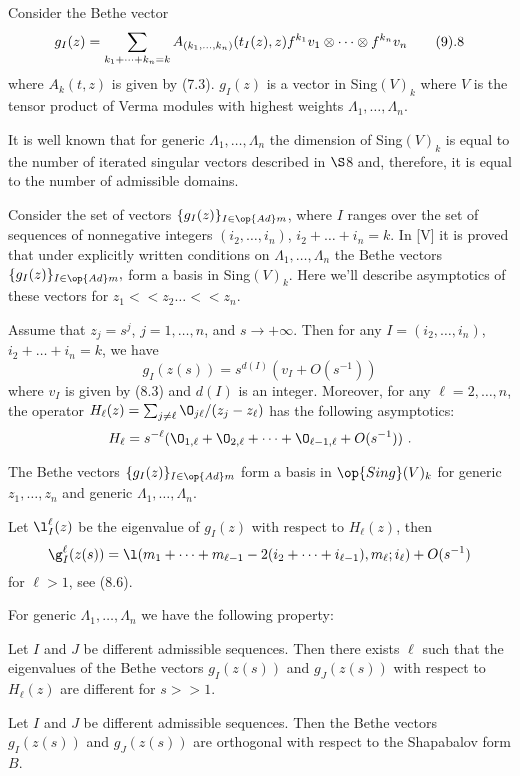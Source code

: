 Consider the Bethe vector
$$
g_I(z) = \sum_{k_1+\dots +k_n=k} A_{(k_1,\dots ,k_n)}
(t_I(z),z)f^{k_1}v_1\otimes\dots\otimes f^{k_n}v_n    \tag 9.8
$$
where $A_k(t,z)$ is given by (7.3). $g_I(z)$ is a vector in
Sing$(V)_k$ where $V$ is the tensor product of Verma modules with
highest weights $\Lambda _1,\dots ,\Lambda _n$.

It is well known that for generic $\Lambda _1,\dots ,\Lambda _n$
the dimension of
Sing$(V)_k$ is equal to the number of iterated singular vectors
described in $\S$8 and, therefore, it is equal to the number of
admissible domains.

Consider the set of vectors $\{ g_I(z)\}_{I\in{\op{ Ad }}m}$, where $I$
ranges over the set of sequences of nonnegative
integers $(i_2,\dots ,i_n)$, $i_2+\dots +i_n=k$. In [V] it is proved
that under explicitly written conditions on $\Lambda _1,
\dots ,\Lambda _n$ the
Bethe vectors $\{g_I(z)\}_{I\in{\op{ Ad }}m},$ form a basis in
Sing$(V)_k$. Here we'll describe asymptotics of these vectors for $z_1
<< z_2 \dots << z_n$.

Assume that $z_j=s^j$, $j=1,\dots ,n$, and
$s\to +\infty$. Then for any $I=(i_2,\dots ,i_n)$, $i_2+\dots +i_n=k$,
we have
$$
g_I(z(s)) = s^{d(I)}(v_I + O(s^{-1}))
$$
where $v_I$ is given by (8.3) and $d(I)$ is an integer.
Moreover, for any $\ell =2,\dots ,n$, the operator
$H_\ell(z) = \sum_{j\neq\ell} \O_{j\ell}/(z_j-z_\ell)$ has the
following asymptotics:
$$
H_\ell = s^{-\ell}(\O_{1, \ell} +\O_{2, \ell} +\dots +\O_{\ell -1 ,\ell}
+O(s^{-1})) \ .
$$
\endproclaim

 The Bethe vectors
$\{ g_I(z)\}_{I\in{\op{ Ad }}m}$ form a basis in ${\op{Sing}}(V)_k$
for generic $z_1,\dots ,z_n$ and generic $\Lambda _1,\dots ,
\Lambda _n$.
\endproclaim

 Let $\l^\ell_I(z)$ be the eigenvalue of
$g_I(z)$ with respect to $H_\ell(z)$, then
$$
\g^\ell_I(z(s)) = \l(m_1+\dots +m_{\ell -1}-2
(i_2+\dots +i_{\ell -1}),m_\ell;i_\ell) + O(s^{-1})
$$
for $\ell > 1$, see (8.6).
\endproclaim

 For generic $\Lambda _1,\dots ,
\Lambda _n$ we have the
following property:

Let $I$ and $J$ be different admissible sequences.
Then there exists $\ell$ such that the eigenvalues of the Bethe
vectors $g_I(z(s))$ and $g_J(z(s))$ with respect to $H_\ell(z)$ are
different for $s >> 1$.
\endproclaim

  Let $I$ and $J$ be different admissible
sequences. Then the Bethe vectors  $g_I(z(s))$ and $g_J(z(s))$ are
orthogonal with respect to the Shapabalov form $B$.
\endproclaim

